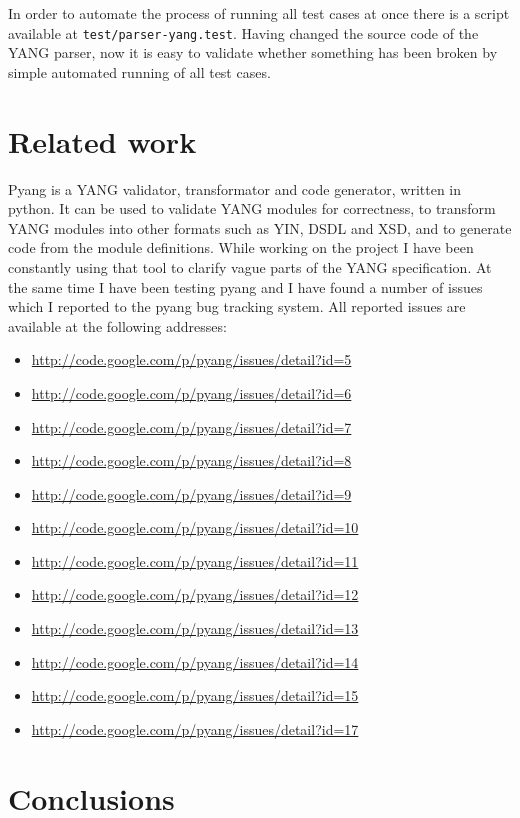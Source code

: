 \documentclass[conference]{IEEEtran}
\begin{document}
In order to automate the process of running all test cases at once there is a script available at \texttt{test/parser-yang.test}. Having changed the source code of the YANG parser, now it is easy to validate whether something has been broken by simple automated running of all test cases.

\section{Related work}
Pyang \cite{bib8} is a YANG validator, transformator and code generator, written in python. It can be used to validate YANG modules for correctness, to transform YANG modules into other formats such as YIN, DSDL and XSD, and to generate code from the module definitions. While working on the project I have been constantly using that tool to clarify vague parts of the YANG specification. At the same time I have been testing pyang and I have found a number of issues which I reported to the pyang bug tracking system. All reported issues are available at the following addresses:
\begin{itemize}
\item \url{http://code.google.com/p/pyang/issues/detail?id=5}
\item \url{http://code.google.com/p/pyang/issues/detail?id=6}
\item \url{http://code.google.com/p/pyang/issues/detail?id=7}
\item \url{http://code.google.com/p/pyang/issues/detail?id=8}
\item \url{http://code.google.com/p/pyang/issues/detail?id=9}
\item \url{http://code.google.com/p/pyang/issues/detail?id=10}
\item \url{http://code.google.com/p/pyang/issues/detail?id=11}
\item \url{http://code.google.com/p/pyang/issues/detail?id=12}
\item \url{http://code.google.com/p/pyang/issues/detail?id=13}
\item \url{http://code.google.com/p/pyang/issues/detail?id=14}
\item \url{http://code.google.com/p/pyang/issues/detail?id=15}
\item \url{http://code.google.com/p/pyang/issues/detail?id=17}
\end{itemize}

\section{Conclusions}
\end{document}
